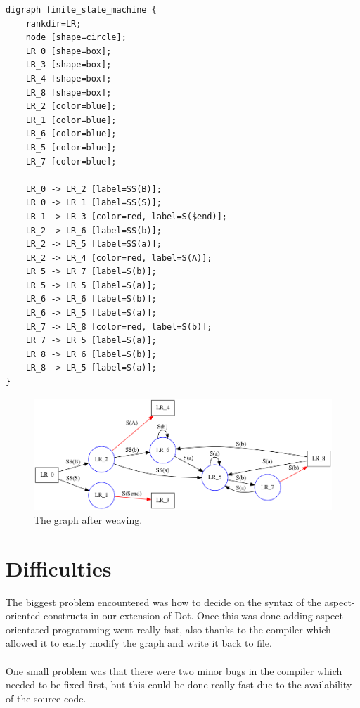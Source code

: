 \documentclass[a4paper]{report}
\begin{document}
\begin{lstlisting}[multicols=2,caption=The woven code.]
digraph finite_state_machine {
	rankdir=LR;
	node [shape=circle];
	LR_0 [shape=box];
	LR_3 [shape=box];
	LR_4 [shape=box];
	LR_8 [shape=box];
	LR_2 [color=blue];
	LR_1 [color=blue];
	LR_6 [color=blue];
	LR_5 [color=blue];
	LR_7 [color=blue];
	
	LR_0 -> LR_2 [label=SS(B)];
	LR_0 -> LR_1 [label=SS(S)];
	LR_1 -> LR_3 [color=red, label=S($end)];
	LR_2 -> LR_6 [label=SS(b)];
	LR_2 -> LR_5 [label=SS(a)];
	LR_2 -> LR_4 [color=red, label=S(A)];
	LR_5 -> LR_7 [label=S(b)];
	LR_5 -> LR_5 [label=S(a)];
	LR_6 -> LR_6 [label=S(b)];
	LR_6 -> LR_5 [label=S(a)];
	LR_7 -> LR_8 [color=red, label=S(b)];
	LR_7 -> LR_5 [label=S(a)];
	LR_8 -> LR_6 [label=S(b)];
	LR_8 -> LR_5 [label=S(a)];
}
\end{lstlisting}
\begin{figure}[h!]
\includegraphics[width=\textwidth]{images/AOFDot/ExampleAfter.png}
\caption{The graph after weaving.}
\end{figure}

\section{Difficulties}
The biggest problem encountered was how to decide on the syntax of the aspect-oriented constructs in our extension of Dot. Once this was done adding aspect-orientated programming went really fast, also thanks to the compiler which allowed it to easily modify the graph and write it back to file.\\
\\
One small problem was that there were two minor bugs in the compiler which needed to be fixed first, but this could be done really fast due to the availability of the source code.
\end{document}
